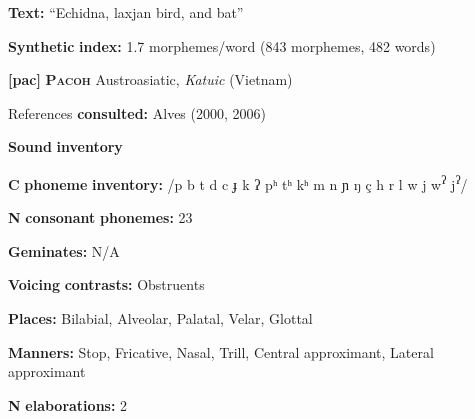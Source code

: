 \documentclass[output=paper]{langsci/langscibook}
\begin{document}
\begin{styleBody}
\textbf{Text:} “Echidna, laxjan bird, and bat” \citep[493-502]{Loughnane2009}
\end{styleBody}

\begin{styleBody}
\textbf{Synthetic} \textbf{index:} 1.7 morphemes/word (843 morphemes, 482 words)
\end{styleBody}

\begin{styleBody}
\textbf{[pac]}   \textbf{\textsc{Pacoh}}  Austroasiatic, \textit{Katuic} (Vietnam)
\end{styleBody}

\begin{styleBody}
References \textbf{consulted:} Alves (2000, 2006)
\end{styleBody}

\begin{styleBody}
\textbf{Sound} \textbf{inventory}
\end{styleBody}

\begin{styleBody}
\textbf{C} \textbf{phoneme} \textbf{inventory:} /p b t d c ɟ k ʔ pʰ tʰ kʰ m n ɲ ŋ ç h r l w j w\textsuperscript{ʔ} j\textsuperscript{ʔ}/
\end{styleBody}

\begin{styleBody}
\textbf{N} \textbf{consonant} \textbf{phonemes:} 23
\end{styleBody}

\begin{styleBody}
\textbf{Geminates:} N/A
\end{styleBody}

\begin{styleBody}
\textbf{Voicing} \textbf{contrasts:} Obstruents
\end{styleBody}

\begin{styleBody}
\textbf{Places:} Bilabial, Alveolar, Palatal, Velar, Glottal
\end{styleBody}

\begin{styleBody}
\textbf{Manners:} Stop, Fricative, Nasal, Trill, Central approximant, Lateral approximant
\end{styleBody}

\begin{styleBody}
\textbf{N} \textbf{elaborations:} 2
\end{styleBody}
\end{document}
